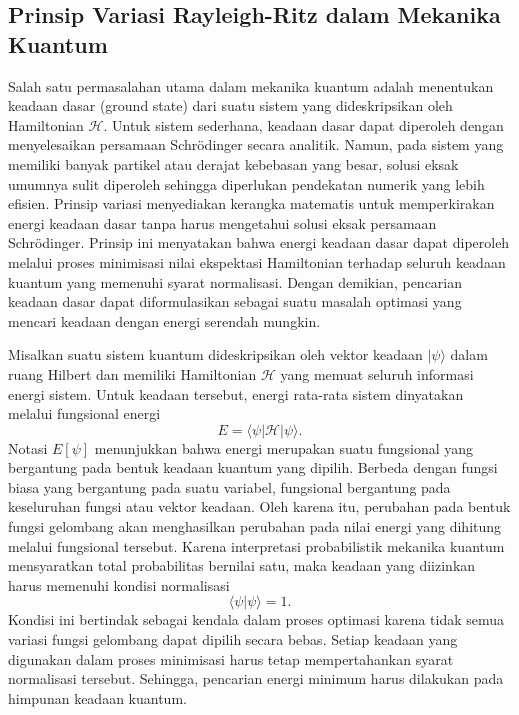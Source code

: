 \subsection{Prinsip Variasi Rayleigh-Ritz dalam Mekanika Kuantum}
Salah satu permasalahan utama dalam mekanika kuantum adalah menentukan keadaan dasar (ground state) dari suatu sistem yang dideskripsikan oleh Hamiltonian $\mathcal{H}$. Untuk sistem sederhana, keadaan dasar dapat diperoleh dengan menyelesaikan persamaan Schrödinger secara analitik. Namun, pada sistem yang memiliki banyak partikel atau derajat kebebasan yang besar, solusi eksak umumnya sulit diperoleh sehingga diperlukan pendekatan numerik yang lebih efisien. Prinsip variasi menyediakan kerangka matematis untuk memperkirakan energi keadaan dasar tanpa harus mengetahui solusi eksak persamaan Schrödinger. Prinsip ini menyatakan bahwa energi keadaan dasar dapat diperoleh melalui proses minimisasi nilai ekspektasi Hamiltonian terhadap seluruh keadaan kuantum yang memenuhi syarat normalisasi. Dengan demikian, pencarian keadaan dasar dapat diformulasikan sebagai suatu masalah optimasi yang mencari keadaan dengan energi serendah mungkin.

Misalkan suatu sistem kuantum dideskripsikan oleh vektor keadaan $|\psi\rangle$ dalam ruang Hilbert dan memiliki Hamiltonian $\mathcal{H}$ yang memuat seluruh informasi energi sistem. Untuk keadaan tersebut, energi rata-rata sistem dinyatakan melalui fungsional energi
\begin{equation}
    \label{eq:fungsional_energi}
    E = \langle \psi | \mathcal{H} | \psi \rangle.
\end{equation}
Notasi $E[\psi]$ menunjukkan bahwa energi merupakan suatu fungsional yang bergantung pada bentuk keadaan kuantum yang dipilih. Berbeda dengan fungsi biasa yang bergantung pada suatu variabel, fungsional bergantung pada keseluruhan fungsi atau vektor keadaan. Oleh karena itu, perubahan pada bentuk fungsi gelombang akan menghasilkan perubahan pada nilai energi yang dihitung melalui fungsional tersebut. Karena interpretasi probabilistik mekanika kuantum mensyaratkan total probabilitas bernilai satu, maka keadaan yang diizinkan harus memenuhi kondisi normalisasi
\begin{equation}
    \label{eq:normalisasi_keadaan}
    \langle \psi | \psi \rangle = 1.
\end{equation}
Kondisi ini bertindak sebagai kendala dalam proses optimasi karena tidak semua variasi fungsi gelombang dapat dipilih secara bebas. Setiap keadaan yang digunakan dalam proses minimisasi harus tetap mempertahankan syarat normalisasi tersebut. Sehingga, pencarian energi minimum harus dilakukan pada himpunan keadaan kuantum.

